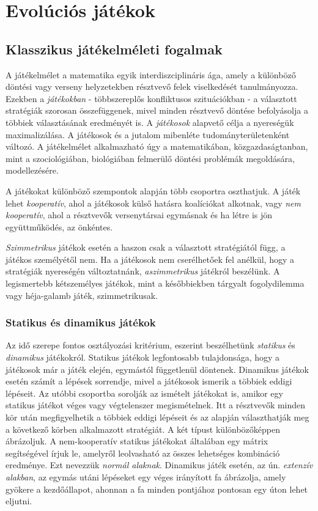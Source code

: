 \chapter{Evolúciós játékok}

\section{Klasszikus játékelméleti fogalmak}
A játékelmélet a matematika egyik interdiszciplináris ága, amely a különböző döntési vagy verseny helyzetekben résztvevő felek viselkedését tanulmányozza. Ezekben a \textit{játékokban} - többszereplős konfliktusos szituációkban - a választott stratégiák szorosan összefüggenek, mivel minden résztvevő döntése befolyásolja a többiek választásának eredményét is.\cite{wiki:gametheory} A \textit{játékosok} alapvető célja a nyereségük maximalizálása. A játékosok és a jutalom mibenléte tudományterületenként változó. A játékelmélet alkalmazható úgy a matematikában, közgazdaságtanban, mint a  szociológiában, biológiában felmerülő döntési problémák megoldására, modellezésére.

A játékokat különböző szempontok alapján több csoportra oszthatjuk. A játék lehet \textit{kooperatív}, ahol a játékosok külső hatásra koalíciókat alkotnak, vagy \textit{nem kooperatív}, ahol a résztvevők versenytársai egymásnak és ha létre is jön együttműködés, az önkéntes. 

\textit{Szimmetrikus} játékok esetén a haszon csak a választott stratégiától függ, a játékos személyétől nem. Ha a játékosok nem cserélhetőek fel anélkül, hogy a stratégiák nyereségén változtatnánk, \textit{aszimmetrikus} játékról beszélünk. A legismertebb kétszemélyes játékok, mint a későbbiekben tárgyalt fogolydilemma vagy héja-galamb játék, szimmetrikusak.

\subsection{Statikus és dinamikus játékok}
Az idő szerepe fontos osztályozási kritérium, eszerint beszélhetünk \textit{statikus} és \textit{dinamikus} játékokról. Statikus játékok legfontosabb tulajdonsága, hogy a játékosok már a játék elején, egymástól függetlenül döntenek. Dinamikus játékok esetén számít a lépések sorrendje, mivel a játékosok ismerik a többiek eddigi lépéseit. Az utóbbi csoportba sorolják az ismételt játékokat is, amikor egy statikus játékot véges vagy végtelenszer megismételnek. Itt a résztvevők minden kör után megfigyelhetik a többiek eddigi lépéseit és az alapján választhatják meg a következő körben alkalmazott stratégiát. A két típust különbözőképpen ábrázoljuk. A nem-kooperatív statikus játékokat általában egy mátrix segítségével írjuk le, amelyről leolvasható az összes lehetséges kombináció eredménye. Ezt nevezzük \textit{normál alaknak}. Dinamikus játék esetén, az ún. \textit{extenzív alakban}, az egymás utáni lépéseket egy véges irányított fa ábrázolja, amely gyökere a kezdőállapot, ahonnan a fa minden pontjához pontosan egy úton lehet eljutni.

